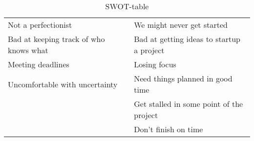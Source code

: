 \begin{table}[h]
\begin{tabular}{|p{}|p{}|}
Not a perfectionist                     & We might never get started\\
Bad at keeping track of who knows what  & Bad at getting ideas to startup a project\\ %
Meeting deadlines                       & Losing focus\\
Uncomfortable with uncertainty          & Need things planned in good time\\
                                        & Get stalled in some point of the project\\
                                        & Don't finish on time\\
\hline
\end{tabular}
\caption{SWOT-table}
\label{SWOT-table}
\end{table}